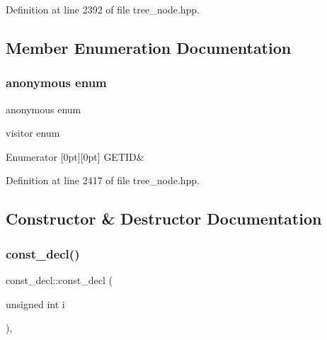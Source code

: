 Definition at line 2392 of file tree\+\_\+node.\+hpp.



\subsection{Member Enumeration Documentation}
\mbox{\label{structconst__decl_af7ab363d7263475e0f4a9fcfd7823638}} 
\subsubsection{\texorpdfstring{anonymous enum}{anonymous enum}}
{\footnotesize\ttfamily anonymous enum}



visitor enum 

\begin{DoxyEnumFields}{Enumerator}
[0pt][0pt]{}\mbox{\label{structconst__decl_af7ab363d7263475e0f4a9fcfd7823638a557a81b18912e4e16d54fd2127853ba1}} 
G\+E\+T\+ID&\\
\hline

\end{DoxyEnumFields}


Definition at line 2417 of file tree\+\_\+node.\+hpp.



\subsection{Constructor \& Destructor Documentation}
\mbox{\label{structconst__decl_a960715e4d6abcbe360584eba210e9bf5}} 
\subsubsection{\texorpdfstring{const\+\_\+decl()}{const\_decl()}}
{\footnotesize\ttfamily const\+\_\+decl\+::const\+\_\+decl (\begin{DoxyParamCaption}\item[{unsigned int}]{i }\end{DoxyParamCaption})\hspace{0.3cm}{\ttfamily [inline]}, {\ttfamily [explicit]}}



